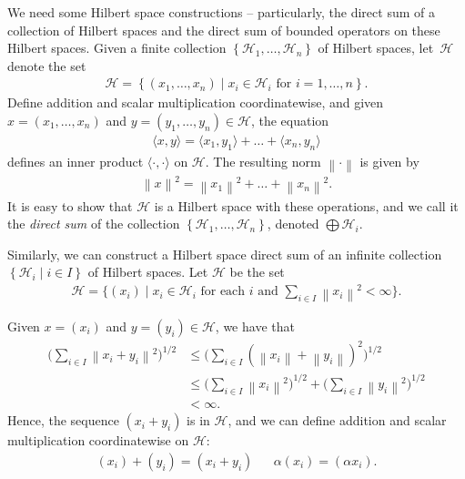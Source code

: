 \documentclass[11pt,a4paper]{report}
\theoremstyle{plain}
\theoremstyle{definition}
\newcommand{\1}{\mathbbm{1}}
\renewcommand{\H}{\mathcal{H}}
\renewcommand{\oplus}{\textstyle\bigoplus}
\begin{document}
We need some Hilbert space constructions -- particularly, the direct sum of a 
collection of Hilbert spaces and the direct sum of bounded operators on these 
Hilbert spaces. Given a finite collection $\left\{\H_1,\dots,\H_n\right\}$ of Hilbert 
spaces, let~$\H$ denote the set
\begin{align*}
	\H  = \left\{(x_1,\dots,x_n) \mid x_i \in \H_i \mbox { for } i=1,\dots,n \right\}.
\end{align*}
Define addition and scalar multiplication coordinatewise, and given 
$x=(x_1,\dots,x_n)$ and $y=(y_1,\dots,y_n) \in \H$, the equation
\begin{align*}
	\langle x,y\rangle = \langle x_1,y_1\rangle + \dots + \langle x_n,y_n \rangle
\end{align*}
defines an inner product $\langle\cdot,\cdot\rangle$ on $\H$. The resulting norm 
$\left\|\cdot\right\|$ is given by
\begin{align*}
	\left\|x\right\|^2 = \left\|x_1\right\|^2 + \dots + \left\|x_n\right\|^2.
\end{align*}
It is easy to show that $\H$ is a Hilbert space with these operations, and we 
call it the \emph{direct sum} of the collection 
$\left\{\H_1,\dots,\H_n\right\}$, denoted $\oplus\H_i$.

Similarly, we can construct a Hilbert space direct sum of an infinite collection 
$\left\{\H_i \mid i\in I\right\}$ of Hilbert spaces. Let $\H$ be the set
\begin{align*}
	\H= \Big\{(x_i) \mid x_i \in \H_i \mbox{ for each }i 
					\mbox{ and } \sum_{i\in I}{\left\|x_i\right\|^2} < \infty \Big\}.
\end{align*}

Given $x=(x_i)$ and $y=(y_i)\in\H$, we have that
\begin{align*}
			\Big(\sum_{i\in I}{\left\|x_i+y_i\right\|^2}\Big)^{1/2}
	&\leq	\Big(\sum_{i\in I}{(\left\|x_i\right\|+\left\|y_i\right\|)^2}\Big)^{1/2}	\\
	&\leq	\Big(\sum_{i\in I}{\left\|x_i\right\|^2}\Big)^{1/2}		+
						\Big(\sum_{i\in I}{\left\|y_i\right\|^2}\Big)^{1/2}				\\
	&< 		\infty.
\end{align*}
Hence, the sequence $(x_i+y_i)$ is in $\H$, and we can define addition and 
scalar multiplication coordinatewise on $\H$:
\begin{align*}
	(x_i)+(y_i)=(x_i+y_i) && \alpha(x_i) = (\alpha x_i).
\end{align*}
\end{document}
